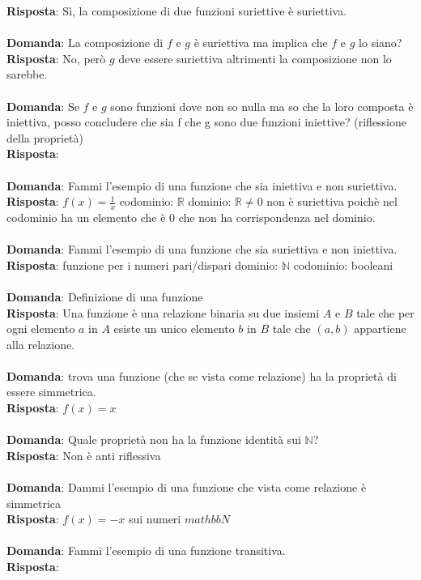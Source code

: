\documentclass{article}
\begin{document}
\textbf{Risposta}: Sì, la composizione di due funzioni suriettive è suriettiva. \\ \\
\textbf{Domanda}: La composizione di $f$ e $g$ è suriettiva ma implica che $f$ e $g$ lo siano? \\
\textbf{Risposta}: No, però $g$ deve essere suriettiva altrimenti la composizione non lo sarebbe. \\ \\
\textbf{Domanda}: Se $f$ e $g$ sono funzioni dove non so nulla ma so che la loro composta è iniettiva, posso concludere che sia f che g sono due funzioni iniettive? (riflessione della proprietà)\\
\textbf{Risposta}: \\ \\
\textbf{Domanda}: Fammi l'esempio di una funzione che sia iniettiva e non suriettiva. \\
\textbf{Risposta}: $f(x) = \frac{1}{x}$ codominio: $\mathbb{R}$ dominio: $\mathbb{R} \neq 0$ non è suriettiva poichè nel codominio ha un elemento che è 0 che non ha corrispondenza nel dominio.\\ \\
\textbf{Domanda}: Fammi l'esempio di una funzione che sia suriettiva e non iniettiva. \\
\textbf{Risposta}: funzione per i numeri pari/dispari dominio: $\mathbb{N}$ codominio: booleani \\ \\
\textbf{Domanda}: Definizione di una funzione \\
\textbf{Risposta}: Una funzione è una relazione binaria su due insiemi $A$ e $B$ tale che per ogni elemento $a$ in $A$ esiste un unico elemento $b$ in $B$ tale che $(a,b)$ appartiene alla relazione. \\ \\
\textbf{Domanda}: trova una funzione (che se vista come relazione) ha la proprietà di essere simmetrica. \\
\textbf{Risposta}: $f(x)=x$ \\ \\
\textbf{Domanda}: Quale proprietà non ha la funzione identità sui $\mathbb{N}$? \\
\textbf{Risposta}: Non è anti riflessiva \\ \\
\textbf{Domanda}: Dammi l'esempio di una funzione che vista come relazione è simmetrica \\
\textbf{Risposta}: $f(x) = -x$ sui numeri $mathbb{N}$\\ \\
\textbf{Domanda}: Fammi l'esempio di una funzione transitiva. \\
\textbf{Risposta}:  \\ \\
\end{document}
